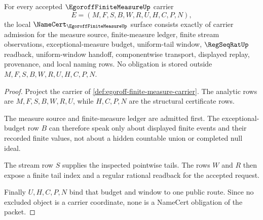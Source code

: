 \begin{theorem}
\label{thm:egoroff-finite-measure-namecert-obligations}
For every accepted $\EgoroffFiniteMeasureUp$ carrier
$$
E=(M,F,S,B,W,R,U,H,C,P,N),
$$
the local $\NameCert_{\EgoroffFiniteMeasureUp}$ surface consists exactly of carrier admission for the measure source, finite-measure ledger, finite stream observations, exceptional-measure budget, uniform-tail window, $\RegSeqRatUp$ readback, uniform-window handoff, componentwise transport, displayed replay, provenance, and local naming rows. No obligation is stored outside $M,F,S,B,W,R,U,H,C,P,N$.
\end{theorem}
\begin{proof}
Project the carrier of \autoref{def:egoroff-finite-measure-carrier}. The analytic rows are $M,F,S,B,W,R,U$, while $H,C,P,N$ are the structural certificate rows.

The measure source and finite-measure ledger are admitted first. The exceptional-budget row $B$ can therefore speak only about displayed finite events and their recorded finite values, not about a hidden countable union or completed null ideal.

The stream row $S$ supplies the inspected pointwise tails. The rows $W$ and $R$ then expose a finite tail index and a regular rational readback for the accepted request.

Finally $U,H,C,P,N$ bind that budget and window to one public route. Since no excluded object is a carrier coordinate, none is a NameCert obligation of the packet.
\end{proof}

